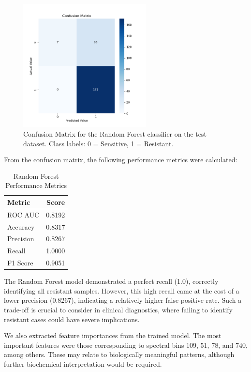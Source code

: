 \documentclass{article}
\begin{document}
\begin{figure}[h]
  \centering
  \includegraphics[width=0.6\textwidth]{confusion_matrix_Random_Forest.png}
  \caption{Confusion Matrix for the Random Forest classifier on the test dataset. Class labels: 0 = Sensitive, 1 = Resistant.}
  \label{fig:rf_confusion_matrix}
\end{figure}

From the confusion matrix, the following performance metrics were calculated:

\begin{table}[h]
\centering
\caption{Random Forest Performance Metrics}
\begin{tabular}{lr}
\toprule
\textbf{Metric} & \textbf{Score} \\
\midrule
ROC AUC   & 0.8192 \\
Accuracy  & 0.8317 \\
Precision & 0.8267 \\
Recall    & 1.0000 \\
F1 Score  & 0.9051 \\
\bottomrule
\end{tabular}
\end{table}

The Random Forest model demonstrated a perfect recall (1.0), correctly identifying all resistant samples. However, this high recall came at the cost of a lower precision (0.8267), indicating a relatively higher false-positive rate. Such a trade-off is crucial to consider in clinical diagnostics, where failing to identify resistant cases could have severe implications.

We also extracted feature importances from the trained model. The most important features were those corresponding to spectral bins 109, 51, 78, and 740, among others. These may relate to biologically meaningful patterns, although further biochemical interpretation would be required.
\end{document}
